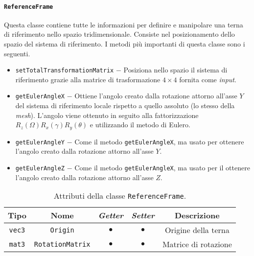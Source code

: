 \paragraph{\texttt{ReferenceFrame}}
Questa classe contiene tutte le informazioni per definire e manipolare una terna di riferimento nello spazio tridimensionale. Consiste nel posizionamento dello spazio del sistema di riferimento. I metodi più importanti di questa classe sono i seguenti.
\begin{itemize}
	\item \texttt{setTotalTransformationMatrix} $-$ Posiziona nello spazio il sistema di riferimento grazie alla matrice di trasformazione $4\times4$ fornita come \textit{input}.
	\item \texttt{getEulerAngleX} $-$ Ottiene l'angolo creato dalla rotazione attorno all'asse $Y$ del sistema di riferimento locale rispetto a quello assoluto (lo stesso della \textit{mesh}). L'angolo viene ottenuto in seguito alla fattorizzazione $R_z(\Omega) R_x(\gamma) R_y(\theta)$ e utilizzando il metodo di Eulero.
	\item \texttt{getEulerAngleY} $-$ Come il metodo \texttt{getEulerAngleX}, ma usato per ottenere l'angolo creato dalla rotazione attorno all'asse $Y$.
	\item \texttt{getEulerAngleZ} $-$ Come il metodo \texttt{getEulerAngleX}, ma usato per il ottenere l'angolo creato dalla rotazione attorno all'asse $Z$.
\end{itemize}
\begin{table}[h!]
	\centering
	\begin{tabular}{|c|c|c|c|c|}
		\hline 
		\textbf{Tipo} & \textbf{Nome} & \textit{\textbf{Getter}} & \textit{\textbf{Setter}} & \textbf{Descrizione} \\ \hline 
		\texttt{vec3} & \texttt{Origin} & $\bullet$ & $\bullet$ & Origine della terna \\ \hline 
		\texttt{mat3} & \texttt{RotationMatrix} & $\bullet$ & $\bullet$ & Matrice di rotazione \\ \hline
	\end{tabular}
	\caption{Attributi della classe \texttt{ReferenceFrame}.}
	\label{}
\end{table}
%

